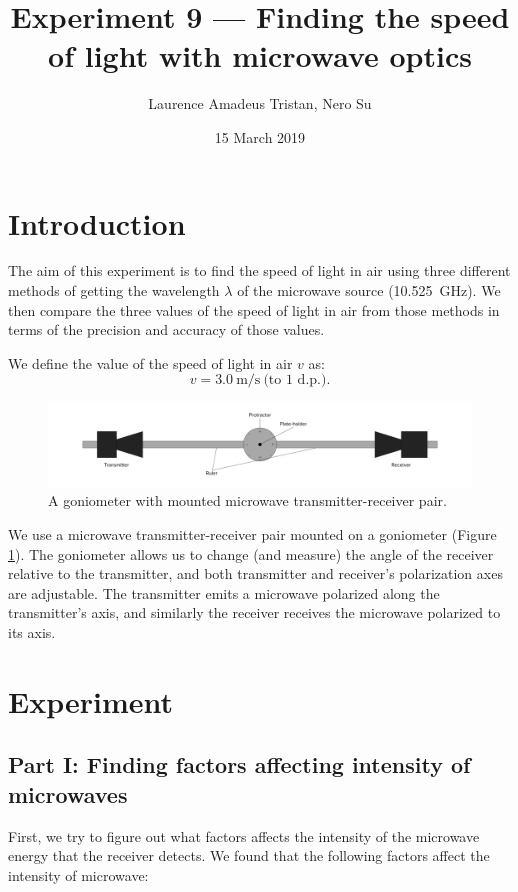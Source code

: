 \documentclass[letter,12pt]{article}
\title{Experiment 9 --- Finding the speed of light with microwave optics}
\author{Laurence Amadeus Tristan, Nero Su}
\date{15 March 2019}
\newcommand{\tlambda}{\(\lambda\) }
\numberwithin{equation}{section}
\numberwithin{figure}{section}
\numberwithin{table}{section}
\begin{document}
\maketitle

\section{Introduction}
The aim of this experiment is to find the speed of light in air using three different methods of getting the wavelength \tlambda of the microwave source (\SI{10.525}{\giga\hertz}). We then compare the three values of the speed of light in air from those methods in terms of the precision and accuracy of those values.

We define the value of the speed of light in air \(v\) as:
\[ v = \SI{3.0}{\metre\per\second} \ \text{(to 1 d.p.)}. \]

\begin{figure}[!ht]
  \centering
  \includegraphics[width=\textwidth]{goniometer.pdf}
  \caption{A goniometer with mounted microwave transmitter-receiver pair.}
  \label{fig:i1}
\end{figure}

We use a microwave transmitter-receiver pair mounted on a goniometer (Figure \ref{fig:i1}). The goniometer allows us to change (and measure) the angle of the receiver relative to the transmitter, and both transmitter and receiver's polarization axes are adjustable. The transmitter emits a microwave polarized along the transmitter's axis, and similarly the receiver receives the microwave polarized to its axis.

\section{Experiment}
\subsection{Part I: Finding factors affecting intensity of microwaves}
First, we try to figure out what factors affects the intensity of the microwave energy that the receiver detects. We found that the following factors affect the intensity of microwave:
\end{document}
